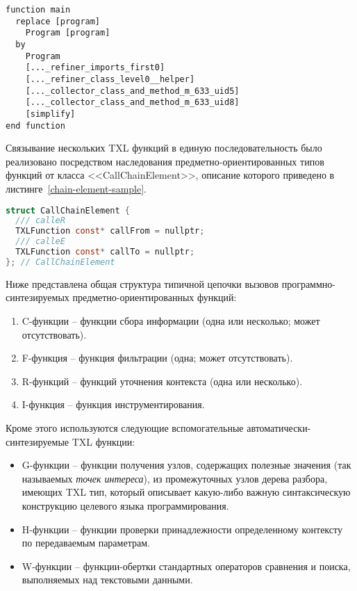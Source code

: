 \begin{lstlisting}[frame=single, language=TXL, label={main-example}, caption={Пример исходного текста главной функции.}]
function main
  replace [program]
    Program [program]
  by
    Program
    [..._refiner_imports_first0]
    [..._refiner_class_level0__helper]
    [..._collector_class_and_method_m_633_uid5]
    [..._collector_class_and_method_m_633_uid8]
    [simplify]
end function
\end{lstlisting}

Связывание нескольких TXL функций в единую последовательность было реализовано посредством наследования предметно-ориентированных типов функций от класса <<CallChainElement>>, описание которого приведено в листинге~\ref{chain-element-sample}.

\begin{lstlisting}[frame=single, language=C, label={chain-element-sample}, caption={Исходный код определения элемента цепочки вызовов.}]
struct CallChainElement {
  /// calleR
  TXLFunction const* callFrom = nullptr;
  /// calleE
  TXLFunction const* callTo = nullptr;
}; // CallChainElement
\end{lstlisting}

Ниже представлена общая структура типичной цепочки вызовов программно-синтезируемых предметно-ориентированных функций:
\begin{enumerate}[noitemsep]
  \item C-функции -- функции сбора информации (одна или несколько; может отсутствовать).
  \item F-функция -- функция фильтрации (одна; может отсутствовать).
  \item R-функций -- функций уточнения контекста (одна или несколько).
  \item I-функция -- функция инструментирования.
\end{enumerate}

Кроме этого используются следующие вспомогательные автоматически-синтезируемые TXL функции:
\begin{itemize}
  \item G-функции -- функции получения узлов, содержащих полезные значения (так называемых \textit{точек интереса}), из промежуточных узлов дерева разбора, имеющих TXL тип, который описывает какую-либо важную синтаксическую конструкцию целевого языка программирования.
  \item H-функции -- функции проверки принадлежности определенному контексту по передаваемым параметрам.
  \item W-функции -- функции-обертки стандартных операторов сравнения и поиска, выполняемых над текстовыми данными.
\end{itemize}

